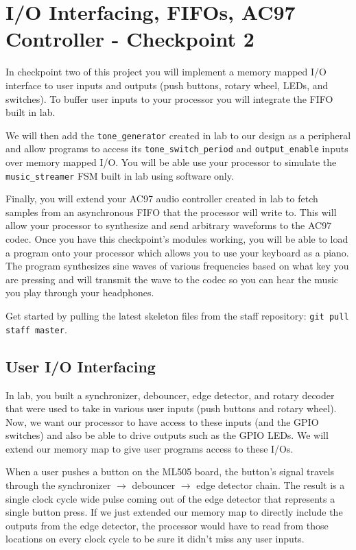 \documentclass[11pt]{article}
\begin{document}
\pagebreak

\section{I/O Interfacing, FIFOs, AC97 Controller - Checkpoint 2}
In checkpoint two of this project you will implement a memory mapped I/O interface to user inputs and outputs (push buttons, rotary wheel, LEDs, and switches). To buffer user inputs to your processor you will integrate the FIFO built in lab.

We will then add the \verb|tone_generator| created in lab to our design as a peripheral and allow programs to access its \verb|tone_switch_period| and \verb|output_enable| inputs over memory mapped I/O. You will be able use your processor to simulate the \verb|music_streamer| FSM built in lab using software only.

Finally, you will extend your AC97 audio controller created in lab to fetch samples from an asynchronous FIFO that the processor will write to. This will allow your processor to synthesize and send arbitrary waveforms to the AC97 codec. Once you have this checkpoint's modules working, you will be able to load a program onto your processor which allows you to use your keyboard as a piano. The program synthesizes sine waves of various frequencies based on what key you are pressing and will transmit the wave to the codec so you can hear the music you play through your headphones.

Get started by pulling the latest skeleton files from the staff repository: \verb|git pull staff master|.

\subsection{User I/O Interfacing}
In lab, you built a synchronizer, debouncer, edge detector, and rotary decoder that were used to take in various user inputs (push buttons and rotary wheel). Now, we want our processor to have access to these inputs (and the GPIO switches) and also be able to drive outputs such as the GPIO LEDs. We will extend our memory map to give user programs access to these I/Os.

When a user pushes a button on the ML505 board, the button's signal travels through the synchronizer $\rightarrow$ debouncer $\rightarrow$ edge detector chain. The result is a single clock cycle wide pulse coming out of the edge detector that represents a single button press. If we just extended our memory map to directly include the outputs from the edge detector, the processor would have to read from those locations on every clock cycle to be sure it didn't miss any user inputs. 
\end{document}
